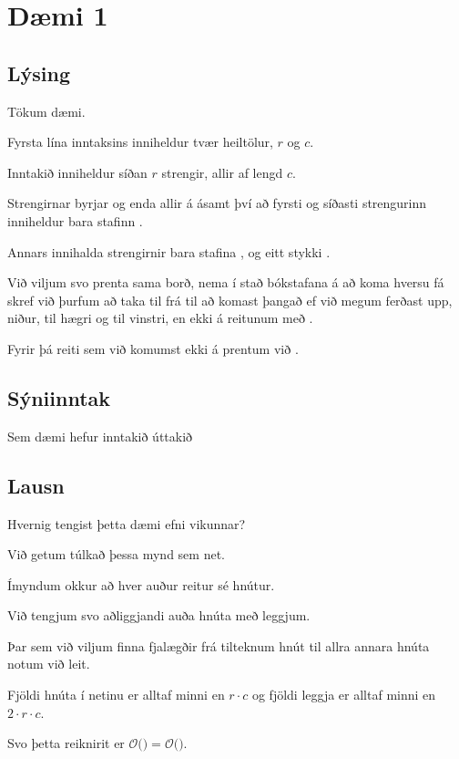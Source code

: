 \section{Dæmi 1}
\subsection{Lýsing}
{
    {
        \item<1-> Tökum dæmi.
        \item<2-> Fyrsta lína inntaksins inniheldur tvær heiltölur, $r$ og $c$.
        \item<3-> Inntakið inniheldur síðan $r$ strengir, allir af lengd $c$.
        \item<4-> Strengirnar byrjar og enda allir á  ásamt því að fyrsti og síðasti strengurinn inniheldur bara stafinn .
        \item<5-> Annars innihalda strengirnir bara stafina ,  og eitt stykki .
        \item<6->[] 
        \item<7-> Við viljum svo prenta sama borð, nema í stað bókstafana á að koma hversu fá skref við þurfum að taka til frá 
                    til að komast þangað ef við megum ferðast upp, niður, til hægri og til vinstri, en ekki á reitunum með .
        \item<8-> Fyrir þá reiti sem við komumst ekki á prentum við .
    }
}

\subsection{Sýniinntak}
{
    {
        \item<1-> Sem dæmi hefur inntakið
                    úttakið    
    }
}

\subsection{Lausn}
{
    {
        \item<1-> Hvernig tengist þetta dæmi efni vikunnar?
        \item<2-> Við getum túlkað þessa mynd sem net.
        \item<3-> Ímyndum okkur að hver auður reitur sé hnútur.
        \item<4-> Við tengjum svo aðliggjandi auða hnúta með leggjum.
        \item<5-> Þar sem við viljum finna fjalægðir frá tilteknum hnút til allra annara hnúta notum við leit.
        \item<7-> Fjöldi hnúta í netinu er alltaf minni en $r \cdot c$ og fjöldi leggja er alltaf minni en $2 \cdot r \cdot c$.
        \item<8-> Svo þetta reiknirit er $\mathcal{O}($$) = \mathcal{O}($$)$.
    }
}

